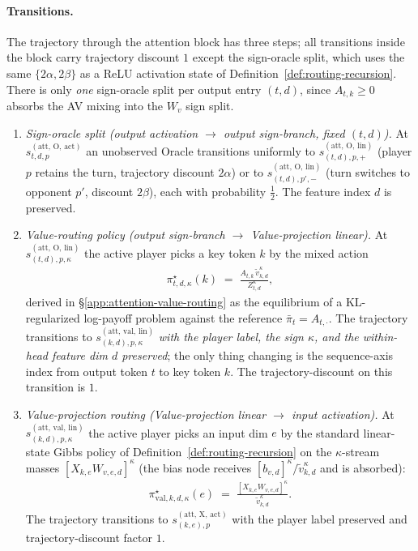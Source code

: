 \documentclass[twoside]{article}
\newcommand{\1}{\mathbf{1}}
\begin{document}
\paragraph{Transitions.} The trajectory through the attention block has three steps; all transitions inside the block carry
trajectory discount $1$ except the sign-oracle split, which uses the same $\{2\alpha, 2\beta\}$ as
a ReLU activation state of Definition~\ref{def:routing-recursion}. There is only \emph{one}
sign-oracle split per output entry $(t,d)$, since $A_{t,k} \ge 0$ absorbs the AV mixing into the
$W_v$ sign split.
\begin{enumerate}
    \item \emph{Sign-oracle split (output activation $\to$ output sign-branch, fixed $(t,d)$).} At
        $s_{t,d,p}^{(\mathrm{att},\,\mathrm{O},\,\mathrm{act})}$ an unobserved Oracle transitions uniformly
        to $s_{(t,d),p,+}^{(\mathrm{att},\,\mathrm{O},\,\mathrm{lin})}$ (player $p$ retains the turn,
        trajectory discount $2\alpha$) or to $s_{(t,d),p',-}^{(\mathrm{att},\,\mathrm{O},\,\mathrm{lin})}$
        (turn switches to opponent $p'$, discount $2\beta$), each with probability $\tfrac12$. The feature
        index $d$ is preserved.
    \item \emph{Value-routing policy (output sign-branch $\to$ Value-projection linear).} At
        $s_{(t,d),p,\kappa}^{(\mathrm{att},\,\mathrm{O},\,\mathrm{lin})}$ the active player picks a key
        token $k$ by the mixed action
        \begin{align}\label{eq:attn-V-routing-policy-O}
            \pi_{t,d,\kappa}^\star(k)
            \;=\; \frac{A_{t,k}\, \tilde{v}_{k,d}^\kappa}{Z_{t,d}^\kappa},
        \end{align}
        derived in \S\ref{app:attention-value-routing} as the equilibrium of a KL-regularized log-payoff
        problem against the reference $\bar\pi_t = A_{t,\cdot}$. The trajectory transitions to
        $s_{(k,d),p,\kappa}^{(\mathrm{att},\,\mathrm{val},\,\mathrm{lin})}$ \emph{with the player label,
        the sign $\kappa$, and the within-head feature dim $d$ preserved}; the only thing changing is the
        sequence-axis index from output token $t$ to key token $k$. The trajectory-discount on this
        transition is $1$.
    \item \emph{Value-projection routing (Value-projection linear $\to$ input activation).} At
        $s_{(k,d),p,\kappa}^{(\mathrm{att},\,\mathrm{val},\,\mathrm{lin})}$ the active player picks an
        input dim $e$ by the standard linear-state Gibbs policy of Definition~\ref{def:routing-recursion}
        on the $\kappa$-stream masses $[X_{k,e}W_{v,e,d}]^\kappa$ (the bias node receives
        $[b_{v,d}]^\kappa/\tilde{v}_{k,d}^\kappa$ and is absorbed):
        \begin{align}\label{eq:attn-V-routing-policy}
            \pi_{\mathrm{val},k,d,\kappa}^\star(e)
            \;=\; \frac{[X_{k,e} W_{v,e,d}]^\kappa}{\tilde{v}_{k,d}^\kappa}.
        \end{align}
        The trajectory transitions to $s_{(k,e),p}^{(\mathrm{att},\,\mathrm{X},\,\mathrm{act})}$ with the
        player label preserved and trajectory-discount factor $1$.
\end{enumerate}
\end{document}
